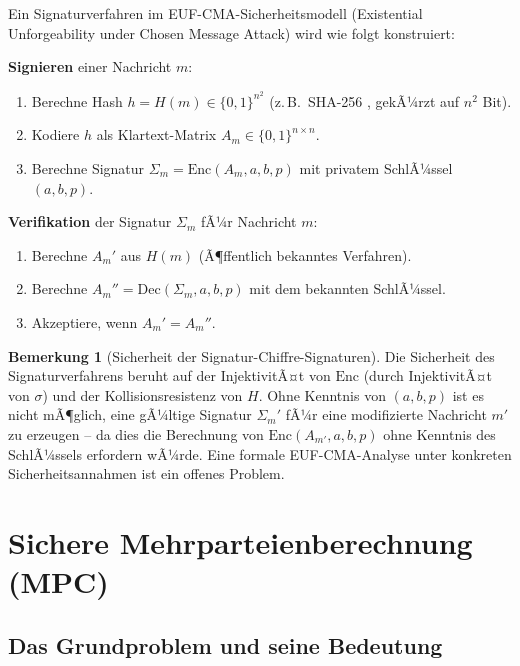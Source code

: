 ﻿\documentclass[a4paper,12pt]{scrreprt}
\theoremstyle{definition}
\newtheorem{bemerkung}{Bemerkung}[section]
\begin{document}
Ein Signaturverfahren im EUF-CMA-Sicherheitsmodell \cite{GMR88} (Existential Unforgeability under Chosen Message Attack) wird wie folgt konstruiert:

\textbf{Signieren} einer Nachricht $m$:
\begin{enumerate}
    \item Berechne Hash $h = H(m) \in \{0,1\}^{n^2}$ (z.\,B.\ SHA-256 \cite{NIST15a}, gekÃ¼rzt auf $n^2$ Bit).
    \item Kodiere $h$ als Klartext-Matrix $A_m \in \{0,1\}^{n \times n}$.
    \item Berechne Signatur $\Sigma_m = \mathrm{Enc}(A_m, a, b, p)$ mit privatem SchlÃ¼ssel $(a,b,p)$.
\end{enumerate}

\textbf{Verifikation} der Signatur $\Sigma_m$ fÃ¼r Nachricht $m$:
\begin{enumerate}
    \item Berechne $A_m'$ aus $H(m)$ (Ã¶ffentlich bekanntes Verfahren).
    \item Berechne $A_m'' = \mathrm{Dec}(\Sigma_m, a, b, p)$ mit dem bekannten SchlÃ¼ssel.
    \item Akzeptiere, wenn $A_m' = A_m''$.
\end{enumerate}

\begin{bemerkung}[Sicherheit der Signatur-Chiffre-Signaturen]
Die Sicherheit des Signaturverfahrens beruht auf der InjektivitÃ¤t von $\mathrm{Enc}$ (durch InjektivitÃ¤t von $\sigma$) und der Kollisionsresistenz von $H$. Ohne Kenntnis von $(a,b,p)$ ist es nicht mÃ¶glich, eine gÃ¼ltige Signatur $\Sigma_m'$ fÃ¼r eine modifizierte Nachricht $m'$ zu erzeugen -- da dies die Berechnung von $\mathrm{Enc}(A_{m'}, a, b, p)$ ohne Kenntnis des SchlÃ¼ssels erfordern wÃ¼rde. Eine formale EUF-CMA-Analyse unter konkreten Sicherheitsannahmen ist ein offenes Problem.
\end{bemerkung}

\section{Sichere Mehrparteienberechnung (MPC)}

\subsection{Das Grundproblem und seine Bedeutung}
\end{document}
